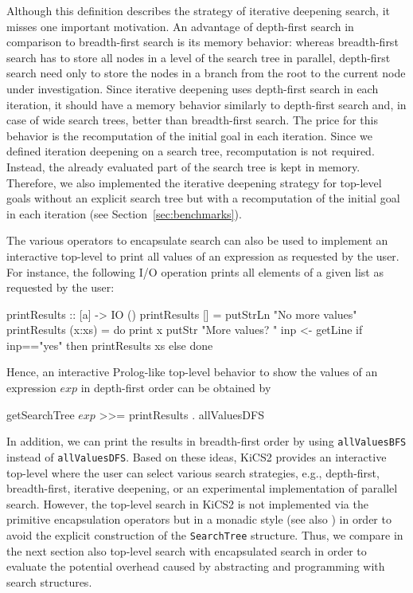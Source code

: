 \documentclass[english]{lni}
\newcommand{\code}[1]{\texttt{\small{}#1}}
\begin{document}
%
Although this definition describes the strategy of
iterative deepening search, it misses one important motivation.
An advantage of depth-first search
in comparison to breadth-first search is its memory behavior:
whereas breadth-first search has to store all nodes
in a level of the search tree in parallel, depth-first search
need only to store the nodes in a branch from the root
to the current node under investigation.
Since iterative deepening uses depth-first search in each iteration,
it should have a memory behavior similarly to depth-first search
and, in case of wide search trees,
better than breadth-first search.
The price for this behavior is the recomputation of the initial
goal in each iteration. Since we defined iteration deepening
on a search tree, recomputation is not required. Instead, the
already evaluated part of the search tree is kept in memory.
Therefore, we also implemented the iterative deepening strategy
for top-level goals without an explicit search tree
but with a recomputation of the initial goal in each iteration
(see Section~\ref{sec:benchmarks}).

The various operators to encapsulate search can also
be used to implement an interactive top-level
to print all values of an expression as requested by the user.
For instance, the following I/O operation prints all elements
of a given list as requested by the user:
\begin{curry}
printResults :: [a] -> IO ()
printResults []     = putStrLn "No more values"
printResults (x:xs) = do print x
                         putStr "More values? "
                         inp <- getLine
                         if inp=="yes" then printResults xs
                                       else done
\end{curry}
Hence, an interactive Prolog-like top-level behavior
to show the values of an expression $exp$ in depth-first order
can be obtained by
\begin{curry}
getSearchTree $exp$ >>= printResults . allValuesDFS
\end{curry}
In addition, we can print the results in breadth-first order
by using \code{allValuesBFS} instead of \code{allValuesDFS}.
Based on these ideas, KiCS2 provides an interactive top-level
where the user can select various search strategies,
e.g., depth-first, breadth-first, iterative deepening, or
an experimental implementation of parallel search.
However, the top-level search in KiCS2 is not implemented
via the primitive encapsulation operators but in
a monadic style (see also \cite{BrasselHanusPeemoellerReck11})
in order to avoid the explicit construction
of the \code{SearchTree} structure.
Thus, we compare in the next section also top-level search
with encapsulated search in order to evaluate the potential overhead
caused by abstracting and programming with search structures.
\end{document}
